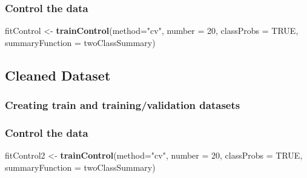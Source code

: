\documentclass[
]{article}
\newenvironment{Shaded}{\begin{snugshade}}{\end{snugshade}}
\newcommand{\CommentTok}[1]{\textcolor[rgb]{0.56,0.35,0.01}{\textit{#1}}}
\newcommand{\DataTypeTok}[1]{\textcolor[rgb]{0.13,0.29,0.53}{#1}}
\newcommand{\DecValTok}[1]{\textcolor[rgb]{0.00,0.00,0.81}{#1}}
\newcommand{\KeywordTok}[1]{\textcolor[rgb]{0.13,0.29,0.53}{\textbf{#1}}}
\newcommand{\NormalTok}[1]{#1}
\newcommand{\OperatorTok}[1]{\textcolor[rgb]{0.81,0.36,0.00}{\textbf{#1}}}
\newcommand{\OtherTok}[1]{\textcolor[rgb]{0.56,0.35,0.01}{#1}}
\newcommand{\StringTok}[1]{\textcolor[rgb]{0.31,0.60,0.02}{#1}}
\begin{document}
\hypertarget{control-the-data}{%
\subsubsection{Control the data}\label{control-the-data}}

\begin{Shaded}
\begin{Highlighting}[]
\NormalTok{fitControl <-}\StringTok{ }\KeywordTok{trainControl}\NormalTok{(}\DataTypeTok{method=}\StringTok{"cv"}\NormalTok{,    }
                           \DataTypeTok{number =} \DecValTok{20}\NormalTok{,    }
                           \DataTypeTok{classProbs =} \OtherTok{TRUE}\NormalTok{,}
                           \DataTypeTok{summaryFunction =}\NormalTok{ twoClassSummary)}
\end{Highlighting}
\end{Shaded}

\hypertarget{cleaned-dataset}{%
\subsection{Cleaned Dataset}\label{cleaned-dataset}}

\hypertarget{creating-train-and-trainingvalidation-datasets-1}{%
\subsubsection{Creating train and training/validation
datasets}\label{creating-train-and-trainingvalidation-datasets-1}}

\begin{Shaded}
\end{Shaded}

\hypertarget{control-the-data-1}{%
\subsubsection{Control the data}\label{control-the-data-1}}

\begin{Shaded}
\begin{Highlighting}[]
\NormalTok{fitControl2 <-}\StringTok{ }\KeywordTok{trainControl}\NormalTok{(}\DataTypeTok{method=}\StringTok{"cv"}\NormalTok{,    }
                           \DataTypeTok{number =} \DecValTok{20}\NormalTok{,    }
                           \DataTypeTok{classProbs =} \OtherTok{TRUE}\NormalTok{,}
                           \DataTypeTok{summaryFunction =}\NormalTok{ twoClassSummary)}
\end{Highlighting}
\end{Shaded}
\end{document}
